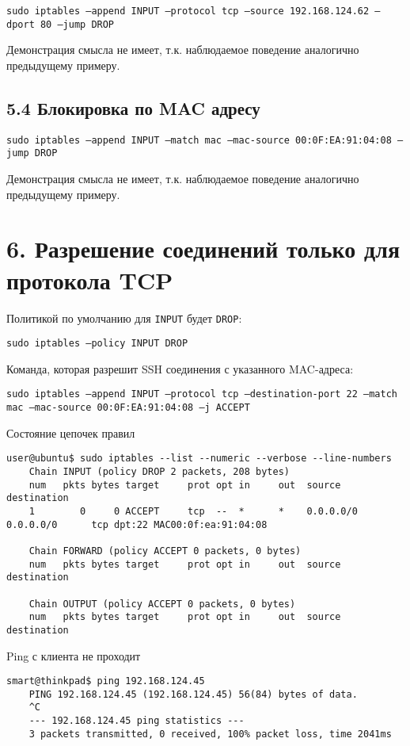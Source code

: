 \texttt{sudo iptables --append INPUT --protocol tcp --source 192.168.124.62 --dport 80 --jump DROP}

Демонстрация смысла не имеет, т.к. наблюдаемое поведение аналогично предыдущему примеру.

\subsection*{5.4 Блокировка по MAC адресу}

\texttt{sudo iptables --append INPUT --match mac --mac-source 00:0F:EA:91:04:08 --jump DROP}

Демонстрация смысла не имеет, т.к. наблюдаемое поведение аналогично предыдущему примеру.

\section*{6. Разрешение соединений только для протокола TCP}

Политикой по умолчанию для \texttt{INPUT} будет \texttt{DROP}:

\texttt{sudo iptables --policy INPUT DROP}

Команда, которая разрешит SSH соединения с указанного MAC-адреса:

\texttt{sudo iptables --append INPUT  --protocol tcp --destination-port 22 --match mac --mac-source 00:0F:EA:91:04:08 --j ACCEPT}

Состояние цепочек правил
\begin{Verbatim}[frame=single]
    user@ubuntu$ sudo iptables --list --numeric --verbose --line-numbers
    Chain INPUT (policy DROP 2 packets, 208 bytes)
    num   pkts bytes target     prot opt in     out  source      destination
    1        0     0 ACCEPT     tcp  --  *      *    0.0.0.0/0   0.0.0.0/0      tcp dpt:22 MAC00:0f:ea:91:04:08

    Chain FORWARD (policy ACCEPT 0 packets, 0 bytes)
    num   pkts bytes target     prot opt in     out  source      destination

    Chain OUTPUT (policy ACCEPT 0 packets, 0 bytes)
    num   pkts bytes target     prot opt in     out  source      destination 
\end{Verbatim}

Ping с клиента не проходит
\begin{Verbatim}[frame=single]
    smart@thinkpad$ ping 192.168.124.45
    PING 192.168.124.45 (192.168.124.45) 56(84) bytes of data.
    ^C
    --- 192.168.124.45 ping statistics ---
    3 packets transmitted, 0 received, 100% packet loss, time 2041ms
\end{Verbatim}

